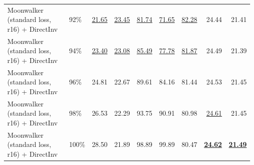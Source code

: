 \documentclass[10pt]{article}
\begin{document}
\begin{table}[htbp]
{\begin{tabular}{llrrrrrrr}
Moonwalker (standard loss, r16) + DirectInv & 92\% & \underline{21.65} & \underline{23.45} & \underline{81.74} & \underline{71.65} & \underline{82.28} & 24.44 & 21.41 \\
Moonwalker (standard loss, r16) + DirectInv & 94\% & \underline{23.40} & \underline{23.08} & \underline{85.49} & \underline{77.78} & \underline{81.87} & 24.49 & 21.39 \\
Moonwalker (standard loss, r16) + DirectInv & 96\% & 24.81 & 22.67 & 89.61 & 84.16 & 81.44 & 24.53 & 21.45 \\
Moonwalker (standard loss, r16) + DirectInv & 98\% & 26.53 & 22.29 & 93.75 & 90.91 & 80.98 & \underline{24.61} & 21.45 \\
Moonwalker (standard loss, r16) + DirectInv & 100\% & 28.50 & 21.89 & 98.89 & 99.89 & 80.47 & \underline{\textbf{24.62}} & \underline{\textbf{21.49}} \\
\bottomrule
\end{tabular}}
\end{table}
\clearpage
\end{document}
